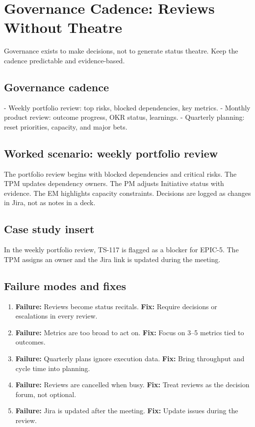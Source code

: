 \section{Governance Cadence: Reviews Without Theatre}
Governance exists to make decisions, not to generate status theatre. Keep the cadence predictable and evidence-based.

\subsection{Governance cadence}
- Weekly portfolio review: top risks, blocked dependencies, key metrics.  
- Monthly product review: outcome progress, OKR status, learnings.  
- Quarterly planning: reset priorities, capacity, and major bets.

\subsection{Worked scenario: weekly portfolio review}
The portfolio review begins with blocked dependencies and critical risks. The TPM updates dependency owners. The PM adjusts Initiative status with evidence. The EM highlights capacity constraints. Decisions are logged as changes in Jira, not as notes in a deck.

\subsection{Case study insert}
In the weekly portfolio review, TS-117 is flagged as a blocker for EPIC-5. The TPM assigns an owner and the Jira link is updated during the meeting.
\subsection{Failure modes and fixes}
\begin{enumerate}
  \item \textbf{Failure:} Reviews become status recitals. \textbf{Fix:} Require decisions or escalations in every review.
  \item \textbf{Failure:} Metrics are too broad to act on. \textbf{Fix:} Focus on 3--5 metrics tied to outcomes.
  \item \textbf{Failure:} Quarterly plans ignore execution data. \textbf{Fix:} Bring throughput and cycle time into planning.
  \item \textbf{Failure:} Reviews are cancelled when busy. \textbf{Fix:} Treat reviews as the decision forum, not optional.
  \item \textbf{Failure:} Jira is updated after the meeting. \textbf{Fix:} Update issues during the review.
\end{enumerate}











